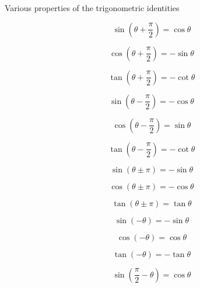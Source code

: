 \documentclass[a4paper]{book}
\begin{document}
Various properties of the trigonometric identities
\begin{description}
\item \begin{equation} \sin(\theta + \frac{\pi}{2}) = \cos \theta \end{equation}
\item \begin{equation} \cos(\theta + \frac{\pi}{2}) = -\sin \theta \end{equation}
\item \begin{equation} \tan(\theta + \frac{\pi}{2}) = -\cot \theta \end{equation}
\item \begin{equation} \sin(\theta - \frac{\pi}{2}) = -\cos \theta \end{equation}
\item \begin{equation} \cos(\theta - \frac{\pi}{2}) = \sin \theta \end{equation}
\item \begin{equation} \tan(\theta - \frac{\pi}{2}) = -\cot \theta \end{equation}
\item \begin{equation} \sin(\theta \pm \pi) = -\sin \theta \end{equation}
\item \begin{equation} \cos(\theta \pm \pi) = -\cos \theta \end{equation}
\item \begin{equation} \tan(\theta \pm \pi) = \tan \theta \end{equation}
\item \begin{equation} \sin(-\theta) = -\sin\theta \end{equation}
\item \begin{equation} \cos(-\theta) = \cos \theta \end{equation}
\item \begin{equation} \tan(-\theta) = -\tan \theta \end{equation}
\item \begin{equation} \sin(\frac{\pi}{2} - \theta) = \cos \theta \end{equation}

\end{description}
\end{document}
